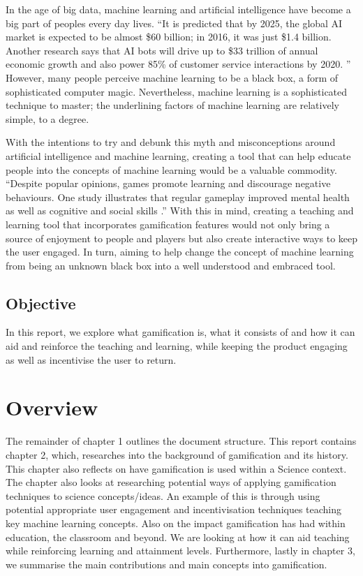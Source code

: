 		In the age of big data, machine learning and artificial intelligence have become a big part of peoples every day lives. “It is predicted that by 2025, the global AI market is expected to be almost \$60 billion; in 2016, it was just \$1.4 billion. Another research says that AI bots will drive up to \$33 trillion of annual economic growth and also power 85\% of customer service interactions by 2020. \cite{hackernoon}” However, many people perceive machine learning to be a black box, a form of sophisticated computer magic. Nevertheless, machine learning is a sophisticated technique to master; the underlining factors of machine learning are relatively simple, to a degree.
		
		With the intentions to try and debunk this myth and misconceptions around artificial intelligence and machine learning, creating a tool that can help educate people into the concepts of machine learning would be a valuable commodity. “Despite popular opinions, games promote learning and discourage negative behaviours. One study illustrates that regular gameplay improved mental health as well as cognitive and social skills \cite{classcraft}.” With this in mind, creating a teaching and learning tool that incorporates gamification features would not only bring a source of enjoyment to people and players but also create interactive ways to keep the user engaged. In turn, aiming to help change the concept of machine learning from being an unknown black box into a well understood and embraced tool.
	
	\subsection{Objective}
		\label{sec:intro_objective} 
		
		In this report, we explore what gamification is, what it consists of and how it can aid and reinforce the teaching and learning, while keeping the product engaging as well as incentivise the user to return.
		
	\section{Overview}  
		\label{sec:intro_overview} 
		
		The remainder of chapter 1 outlines the document structure. This report contains chapter 2, which, researches into the background of gamification and its history. This chapter also reflects on have gamification is used within a Science context. The chapter also looks at researching potential ways of applying gamification techniques to science concepts/ideas. An example of this is through using potential appropriate user engagement and incentivisation techniques teaching key machine learning concepts. Also on the impact gamification has had within education, the classroom and beyond. We are looking at how it can aid teaching while reinforcing learning and attainment levels. Furthermore, lastly in chapter 3, we summarise the main contributions and main concepts into gamification.
	
